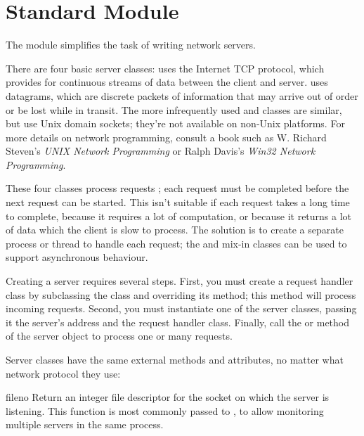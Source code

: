\section{Standard Module }
\label{module-SocketServer}

The  module simplifies the task of writing network
servers.

There are four basic server classes:  uses the
Internet TCP protocol, which provides for continuous streams of data
between the client and server.   uses datagrams, which
are discrete packets of information that may arrive out of order or be
lost while in transit.  The more infrequently used
 and  classes are
similar, but use Unix domain sockets; they're not available on
non-Unix platforms.  For more details on network programming, consult
a book such as W. Richard Steven's \emph{UNIX Network Programming}
or Ralph Davis's \emph{Win32 Network Programming}.

These four classes process requests ; each request
must be completed before the next request can be started.  This isn't
suitable if each request takes a long time to complete, because it
requires a lot of computation, or because it returns a lot of data
which the client is slow to process.  The solution is to create a
separate process or thread to handle each request; the
 and  mix-in classes can be
used to support asynchronous behaviour.

Creating a server requires several steps.  First, you must create a
request handler class by subclassing the 
class and overriding its  method; this method will
process incoming requests.  Second, you must instantiate one of the
server classes, passing it the server's address and the request
handler class.  Finally, call the  or
 method of the server object to process one or
many requests.

Server classes have the same external methods and attributes, no
matter what network protocol they use:

\renewcommand{\indexsubitem}{(SocketServer protocol)}


\begin{funcdesc}{fileno}{}
Return an integer file descriptor for the socket on which the server
is listening.  This function is most commonly passed to
, to allow monitoring multiple servers in the
same process.
\end{funcdesc}

